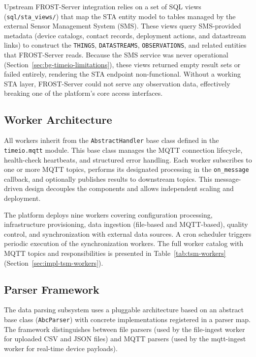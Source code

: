 Upstream FROST-Server integration relies on a set of SQL views
(\texttt{sql/sta\_views/}) that map the STA entity model to tables managed by the external
Sensor Management System (SMS). These views query SMS-provided metadata (device catalogs,
contact records, deployment actions, and datastream links) to construct the
\texttt{THINGS}, \texttt{DATASTREAMS}, \texttt{OBSERVATIONS}, and related entities that
FROST-Server reads. Because the SMS service was never operational
(Section~\ref{sec:bg-timeio-limitations}), these views returned empty result sets or failed
entirely, rendering the STA endpoint non-functional. Without a working STA layer, FROST-Server
could not serve any observation data, effectively breaking one of the platform's core access
interfaces.

\subsection{Worker Architecture}
\label{sec:bg-timeio-workers}

All workers inherit from the \texttt{AbstractHandler} base class defined in the \texttt{timeio.mqtt}
module. This base class manages the MQTT connection lifecycle, health-check heartbeats, and
structured error handling. Each worker subscribes to one or more MQTT topics, performs its
designated processing in the \texttt{on\_message} callback, and optionally publishes results
to downstream topics. This message-driven design decouples the components and allows
independent scaling and deployment.

The platform deploys nine workers covering configuration processing, infrastructure
provisioning, data ingestion (file-based and MQTT-based), quality control, and
synchronization with external data sources. A cron scheduler triggers periodic execution
of the synchronization workers. The full worker catalog with MQTT topics and
responsibilities is presented in Table~\ref{tab:tsm-workers}
(Section~\ref{sec:impl-tsm-workers}).

\subsection{Parser Framework}
\label{sec:bg-timeio-parsers}

The data parsing subsystem uses a pluggable architecture based on an abstract base class
(\texttt{AbcParser}) with concrete implementations registered in a parser map. The framework
distinguishes between file parsers (used by the file-ingest worker for uploaded CSV and JSON
files) and MQTT parsers (used by the mqtt-ingest worker for real-time device payloads).

